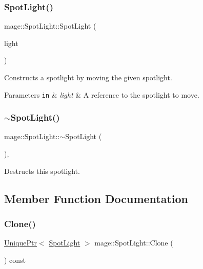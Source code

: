 \subsubsection{\texorpdfstring{Spot\+Light()}{SpotLight()}\hspace{0.1cm}{\footnotesize\ttfamily [3/3]}}
{\footnotesize\ttfamily mage\+::\+Spot\+Light\+::\+Spot\+Light (\begin{DoxyParamCaption}\item[{\hyperlink{classmage_1_1_spot_light}{Spot\+Light} \&\&}]{light }\end{DoxyParamCaption})\hspace{0.3cm}{\ttfamily [default]}}

Constructs a spotlight by moving the given spotlight.


\begin{DoxyParams}[1]{Parameters}
\mbox{\tt in}  & {\em light} & A reference to the spotlight to move. \\
\hline
\end{DoxyParams}
\hypertarget{classmage_1_1_spot_light_aeeaba91c6448102ac6a23587c5366808}{}\label{classmage_1_1_spot_light_aeeaba91c6448102ac6a23587c5366808} 
\subsubsection{\texorpdfstring{$\sim$\+Spot\+Light()}{~SpotLight()}}
{\footnotesize\ttfamily mage\+::\+Spot\+Light\+::$\sim$\+Spot\+Light (\begin{DoxyParamCaption}{ }\end{DoxyParamCaption})\hspace{0.3cm}{\ttfamily [virtual]}, {\ttfamily [default]}}

Destructs this spotlight. 

\subsection{Member Function Documentation}
\hypertarget{classmage_1_1_spot_light_a1092a1238be8cfd771a43e6976d16270}{}\label{classmage_1_1_spot_light_a1092a1238be8cfd771a43e6976d16270} 
\subsubsection{\texorpdfstring{Clone()}{Clone()}}
{\footnotesize\ttfamily \hyperlink{namespacemage_a3316d7143a973e37adf1110f2e80ca31}{Unique\+Ptr}$<$ \hyperlink{classmage_1_1_spot_light}{Spot\+Light} $>$ mage\+::\+Spot\+Light\+::\+Clone (\begin{DoxyParamCaption}{ }\end{DoxyParamCaption}) const}


